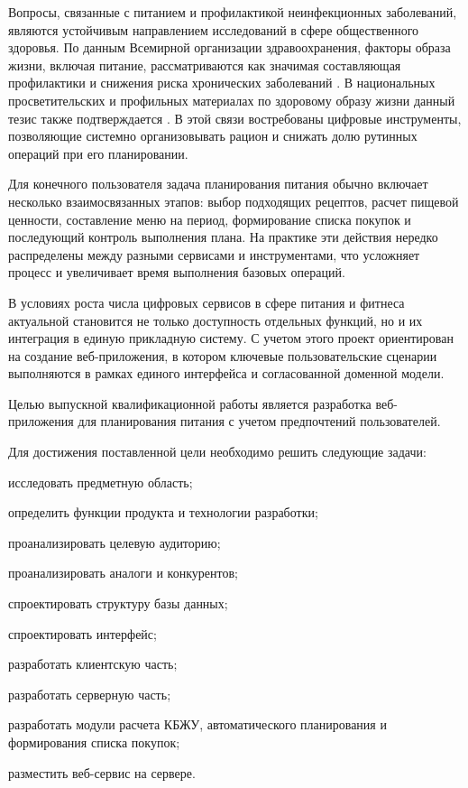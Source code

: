 \Introduction

Вопросы, связанные с питанием и профилактикой неинфекционных заболеваний, являются устойчивым направлением исследований в сфере общественного здоровья. По данным Всемирной организации здравоохранения, факторы образа жизни, включая питание, рассматриваются как значимая составляющая профилактики и снижения риска хронических заболеваний \cite{who2025stats,who_healthy_diet_2026}. В национальных просветительских и профильных материалах по здоровому образу жизни данный тезис также подтверждается \cite{takzdorovo_healthy_2026,rpn_healthy_food_2026}. В этой связи востребованы цифровые инструменты, позволяющие системно организовывать рацион и снижать долю рутинных операций при его планировании.

Для конечного пользователя задача планирования питания обычно включает несколько взаимосвязанных этапов: выбор подходящих рецептов, расчет пищевой ценности, составление меню на период, формирование списка покупок и последующий контроль выполнения плана. На практике эти действия нередко распределены между разными сервисами и инструментами, что усложняет процесс и увеличивает время выполнения базовых операций.

В условиях роста числа цифровых сервисов в сфере питания и фитнеса актуальной становится не только доступность отдельных функций, но и их интеграция в единую прикладную систему. С учетом этого проект ориентирован на создание веб-приложения, в котором ключевые пользовательские сценарии выполняются в рамках единого интерфейса и согласованной доменной модели.

Целью выпускной квалификационной работы является разработка веб-приложения для планирования питания с учетом предпочтений пользователей.

Для достижения поставленной цели необходимо решить следующие задачи:
\begin{compactlist}
  \item исследовать предметную область;
  \item определить функции продукта и технологии разработки;
  \item проанализировать целевую аудиторию;
  \item проанализировать аналоги и конкурентов;
  \item спроектировать структуру базы данных;
  \item спроектировать интерфейс;
  \item разработать клиентскую часть;
  \item разработать серверную часть;
  \item разработать модули расчета КБЖУ, автоматического планирования и формирования списка покупок;
  \item разместить веб-сервис на сервере.
\end{compactlist}

